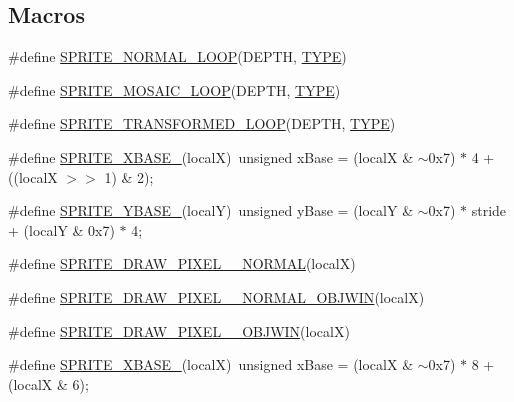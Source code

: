 \subsection*{Macros}
\begin{DoxyCompactItemize}
\item 
\#define \mbox{\hyperlink{software-obj_8c_ae8f834900ccb77f932ffc98dc17e0375}{S\+P\+R\+I\+T\+E\+\_\+\+N\+O\+R\+M\+A\+L\+\_\+\+L\+O\+OP}}(D\+E\+P\+TH,  \mbox{\hyperlink{inflate_8h_a164ea0159d5f0b5f12a646f25f99eceaab47ea8bb955afd0adc0ef98517dd6084}{T\+Y\+PE}})
\item 
\#define \mbox{\hyperlink{software-obj_8c_aaefd49556ffb9bf95e066a59b135c7e7}{S\+P\+R\+I\+T\+E\+\_\+\+M\+O\+S\+A\+I\+C\+\_\+\+L\+O\+OP}}(D\+E\+P\+TH,  \mbox{\hyperlink{inflate_8h_a164ea0159d5f0b5f12a646f25f99eceaab47ea8bb955afd0adc0ef98517dd6084}{T\+Y\+PE}})
\item 
\#define \mbox{\hyperlink{software-obj_8c_a52211ae275735bbf560e757280a1333a}{S\+P\+R\+I\+T\+E\+\_\+\+T\+R\+A\+N\+S\+F\+O\+R\+M\+E\+D\+\_\+\+L\+O\+OP}}(D\+E\+P\+TH,  \mbox{\hyperlink{inflate_8h_a164ea0159d5f0b5f12a646f25f99eceaab47ea8bb955afd0adc0ef98517dd6084}{T\+Y\+PE}})
\item 
\#define \mbox{\hyperlink{software-obj_8c_a3d841add7f051a581ae5adc380199c1e}{S\+P\+R\+I\+T\+E\+\_\+\+X\+B\+A\+S\+E\+\_}}(localX)~unsigned x\+Base = (localX \& $\sim$0x7) $\ast$ 4 + ((local\+X $>$$>$ 1) \& 2);
\item 
\#define \mbox{\hyperlink{software-obj_8c_a5fe7924604b217e2a8468b277c365f95}{S\+P\+R\+I\+T\+E\+\_\+\+Y\+B\+A\+S\+E\+\_}}(localY)~unsigned y\+Base = (localY \& $\sim$0x7) $\ast$ stride + (local\+Y \& 0x7) $\ast$ 4;
\item 
\#define \mbox{\hyperlink{software-obj_8c_aac77b52568fd9946f71fb29ec06bcfda}{S\+P\+R\+I\+T\+E\+\_\+\+D\+R\+A\+W\+\_\+\+P\+I\+X\+E\+L\+\_\+\_\+\+N\+O\+R\+M\+AL}}(localX)
\item 
\#define \mbox{\hyperlink{software-obj_8c_a0c23d6dcd315efefa9605c43ebc0aa13}{S\+P\+R\+I\+T\+E\+\_\+\+D\+R\+A\+W\+\_\+\+P\+I\+X\+E\+L\+\_\+\_\+\+N\+O\+R\+M\+A\+L\+\_\+\+O\+B\+J\+W\+IN}}(localX)
\item 
\#define \mbox{\hyperlink{software-obj_8c_a7209290253a5783ebacce01ce9519508}{S\+P\+R\+I\+T\+E\+\_\+\+D\+R\+A\+W\+\_\+\+P\+I\+X\+E\+L\+\_\+\_\+\+O\+B\+J\+W\+IN}}(localX)
\item 
\#define \mbox{\hyperlink{software-obj_8c_aa93d2a8af73713a8b0febc3c5da1f0cf}{S\+P\+R\+I\+T\+E\+\_\+\+X\+B\+A\+S\+E\+\_}}(localX)~unsigned x\+Base = (localX \& $\sim$0x7) $\ast$ 8 + (local\+X \& 6);
$$
\end{DoxyCompactItemize}
